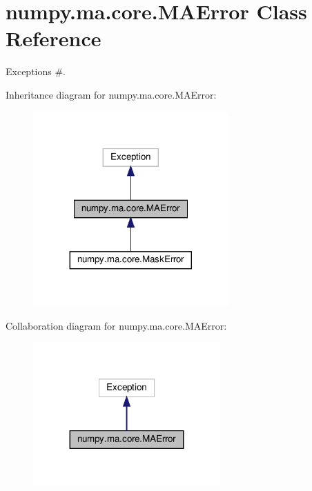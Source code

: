 \hypertarget{classnumpy_1_1ma_1_1core_1_1MAError}{}\section{numpy.\+ma.\+core.\+M\+A\+Error Class Reference}
\label{classnumpy_1_1ma_1_1core_1_1MAError}


Exceptions \#.  




Inheritance diagram for numpy.\+ma.\+core.\+M\+A\+Error\+:
\nopagebreak
\begin{figure}[H]
\begin{center}
\leavevmode
\includegraphics[width=212pt]{classnumpy_1_1ma_1_1core_1_1MAError__inherit__graph}
\end{center}
\end{figure}


Collaboration diagram for numpy.\+ma.\+core.\+M\+A\+Error\+:
\nopagebreak
\begin{figure}[H]
\begin{center}
\leavevmode
\includegraphics[width=203pt]{classnumpy_1_1ma_1_1core_1_1MAError__coll__graph}
\end{center}
\end{figure}


